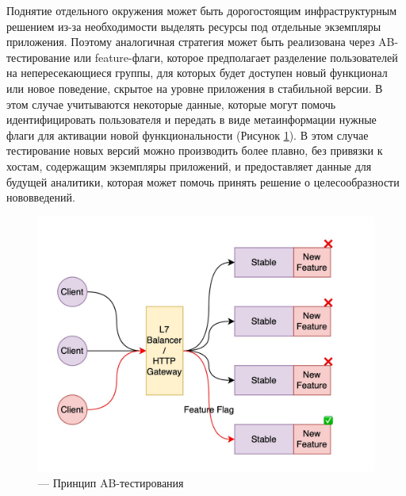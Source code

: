 Поднятие отдельного окружения может быть дорогостоящим инфраструктурным решением из-за необходимости
выделять ресурсы под отдельные экземпляры приложения. Поэтому аналогичная стратегия может быть
реализована через AB-тестирование или feature-флаги, которое предполагает разделение
пользователей на непересекающиеся группы, для которых будет доступен новый функционал или новое поведение,
скрытое на уровне приложения в стабильной версии. В этом случае учитываются некоторые данные,
которые могут помочь идентифицировать пользователя и передать в виде метаинформации нужные флаги
для активации новой функциональности (Рисунок \ref{fig:ab}). В этом случае тестирование новых версий можно производить более плавно, без
привязки к хостам, содержащим экземпляры приложений, и предоставляет данные для будущей
аналитики, которая может помочь принять решение о целесообразности нововведений.

\begin{figure}[H]
    \centering
    \includegraphics[width=0.8\linewidth]{img/ab.jpg}
    \caption{--- Принцип AB-тестирования}
    \label{fig:ab}
\end{figure}

